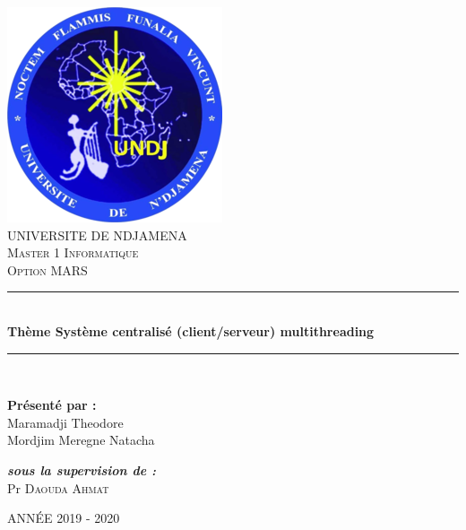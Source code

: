 \documentclass[12pt, openany]{report}
\newcommand{\HRule}{\rule{\linewidth}{0.5mm}}
\begin{document}
\begin{titlepage}
  \begin{sffamily}
  \begin{center}
  \includegraphics[scale=0.8]{logo.jpg}~\\[1.5cm]
  \textsc{\LARGE UNIVERSITE DE NDJAMENA}\\[2cm]
\textsc{\Large Master 1 Informatique\\ Option MARS}
    \HRule \\[0.4cm]
    { \huge \bfseries Thème Système centralisé (client/serveur) multithreading
\\[0.4cm] }

    \HRule \\[2cm]

    \begin{minipage}{0.4\textwidth}
      \begin{flushleft} \large
      \textbf{ Présenté par :}\\
      Maramadji Theodore \\Mordjim Meregne Natacha
      \end{flushleft}
    \end{minipage}
    \begin{minipage}{0.4\textwidth}
      \begin{flushright} \large
        \emph{\textbf{sous la supervision de :}}\\ Pr \textsc{ Daouda Ahmat}\\
      \end{flushright}
    \end{minipage}

    \vfill
    {\large ANNÉE 2019 - 2020 }

  \end{center}
  \end{sffamily}
\end{titlepage}
\end{document}
